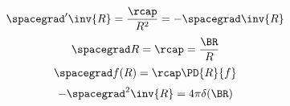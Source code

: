 
\begin{equation}\label{eqn:emtLecture3:540}
\spacegrad' \inv{R} = \frac{\rcap}{R^2} = -\spacegrad \inv{R}
\end{equation}
\begin{equation}\label{eqn:emtLecture3:560}
\spacegrad R = \rcap = \frac{\BR}{R}
\end{equation}
\begin{equation}\label{eqn:emtLecture3:580}
\spacegrad f(R) = \rcap \PD{R}{f}
\end{equation}
\begin{equation}\label{eqn:emtLecture3:600}
-\spacegrad^2 \inv{R} = 4\pi \delta(\BR)
\end{equation}


